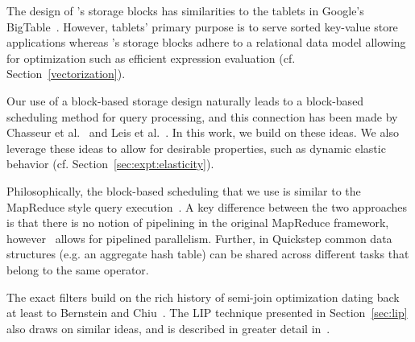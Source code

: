 

The design of \Quickstep's storage blocks has similarities to the tablets in Google's BigTable~\cite{DBLP:conf/osdi/ChangDGHWBCFG06}.
However, tablets' primary purpose is to serve sorted key-value store applications whereas  \Quickstep's storage blocks adhere to a  relational data model allowing for optimization such as efficient expression evaluation (cf. Section~\ref{vectorization}).

Our use of a block-based storage design naturally leads to a block-based scheduling method for query processing, and this connection has been made by Chasseur et al.~\cite{ChasseurP13} and Leis et al.~\cite{LeisBK014}.
In this work, we build on these ideas. 
We also leverage these ideas to allow for desirable properties, such as dynamic elastic behavior (cf. Section~\ref{sec:expt:elasticity}).

Philosophically, the block-based scheduling that we use is similar to the MapReduce style query execution~\cite{mapreduce}. 
A key difference between the two approaches is that there is no notion of pipelining in the original MapReduce framework, however \Quickstep\ allows for pipelined parallelism.  Further, in Quickstep common data structures (e.g. an aggregate hash table) can be shared across different tasks that belong to the same operator.

The exact filters build on the rich history of semi-join optimization dating back at least to Bernstein and Chiu~\cite{Bernstein1981SemiJoin}. The LIP technique presented in Section~\ref{sec:lip} also draws on similar ideas, and is described in greater detail in~\cite{zhu2017looking}. 

